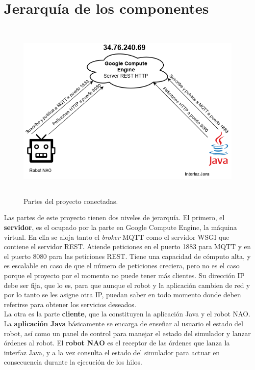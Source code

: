 \documentclass[12pt,spanish,listoffigures,listoftables]{tfgetsinf}
\begin{document}
\section{Jerarquía de los componentes}

\begin{figure}[!h]
	\centering
	\includegraphics[height=9cm]{img/Conexion}
	\caption{Partes del proyecto conectadas.}
	\label{figura:conexionpartes}
\end{figure}

Las partes de este proyecto tienen dos niveles de jerarquía. El primero, el \textbf{servidor}, es el ocupado por la parte en Google Compute Engine, la máquina virtual. En ella se aloja tanto el \textit{broker} MQTT como el servidor WSGI que contiene el servidor REST. Atiende peticiones en el puerto 1883 para MQTT y en el puerto 8080 para las peticiones REST. Tiene una capacidad de cómputo alta, y es escalable en caso de que el número de peticiones creciera, pero no es el caso porque el proyecto por el momento no puede tener más clientes. Su dirección IP debe ser fija, que lo es, para que aunque el robot y la aplicación cambien de red y por lo tanto se les asigne otra IP, puedan saber en todo momento donde deben referirse para obtener los servicios deseados.\\

La otra es la parte \textbf{cliente}, que la constituyen la aplicación Java y el robot NAO. La \textbf{aplicación Java} básicamente se encarga de enseñar al usuario el estado del robot, así como un panel de control para manejar el estado del simulador y lanzar órdenes al robot. El \textbf{robot NAO} es el receptor de las órdenes que lanza la interfaz Java, y a la vez consulta el estado del simulador para actuar en consecuencia durante la ejecución de los hilos. \\
\end{document}
